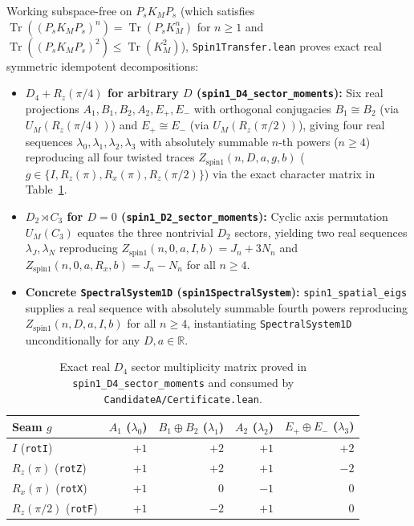 \documentclass[11pt,a4paper]{article}
\newcommand{\id}[1]{{\small\nolinkurl{#1}}}
\newcommand{\Tr}{\operatorname{Tr}}
\newcommand{\R}{\mathbb{R}}
\begin{document}
Working subspace-free on $P_s K_M P_s$ (which satisfies $\Tr((P_s K_M P_s)^n) = \Tr(P_s K_M^n)$ for $n \ge 1$ and $\Tr((P_s K_M P_s)^2) \le \Tr(K_M^2)$), \id{Spin1Transfer.lean} proves exact real symmetric idempotent decompositions:
\begin{itemize}[leftmargin=1.6em,itemsep=2pt]
  \item \textbf{$D_4 + R_z(\pi/4)$ for arbitrary $D$ (\id{spin1_D4_sector_moments}):} Six real projections $A_1, B_1, B_2, A_2, E_+, E_-$ with orthogonal conjugacies $B_1 \cong B_2$ (via $U_M(R_z(\pi/4))$) and $E_+ \cong E_-$ (via $U_M(R_z(\pi/2))$), giving four real sequences $\lambda_0, \lambda_1, \lambda_2, \lambda_3$ with absolutely summable $n$-th powers ($n \ge 4$) reproducing all four twisted traces $Z_{\mathrm{spin1}}(n, D, a, g, b)$ ($g \in \{I, R_z(\pi), R_x(\pi), R_z(\pi/2)\}$) via the exact character matrix in Table~\ref{tab:d4}.
  \item \textbf{$D_2 \rtimes C_3$ for $D = 0$ (\id{spin1_D2_sector_moments}):} Cyclic axis permutation $U_M(C_3)$ equates the three nontrivial $D_2$ sectors, yielding two real sequences $\lambda_J, \lambda_N$ reproducing $Z_{\mathrm{spin1}}(n, 0, a, I, b) = J_n + 3 N_n$ and $Z_{\mathrm{spin1}}(n, 0, a, R_x, b) = J_n - N_n$ for all $n \ge 4$.
  \item \textbf{Concrete \id{SpectralSystem1D} (\id{spin1SpectralSystem}):} \id{spin1_spatial_eigs} supplies a real sequence with absolutely summable fourth powers reproducing $Z_{\mathrm{spin1}}(n, D, a, I, b)$ for all $n \ge 4$, instantiating \id{SpectralSystem1D} unconditionally for any $D, a \in \R$.
\end{itemize}

\begin{table}[t]
\centering
\small
\begin{tabular}{@{}lrrrr@{}}
\toprule
\textbf{Seam $g$} & $A_1$ ($\lambda_0$) & $B_1 \oplus B_2$ ($\lambda_1$) & $A_2$ ($\lambda_2$) & $E_+ \oplus E_-$ ($\lambda_3$) \\
\midrule
$I$ (\id{rotI}) & $+1$ & $+2$ & $+1$ & $+2$ \\
$R_z(\pi)$ (\id{rotZ}) & $+1$ & $+2$ & $+1$ & $-2$ \\
$R_x(\pi)$ (\id{rotX}) & $+1$ & $0$ & $-1$ & $0$ \\
$R_z(\pi/2)$ (\id{rotF}) & $+1$ & $-2$ & $+1$ & $0$ \\
\bottomrule
\end{tabular}
\caption{Exact real $D_4$ sector multiplicity matrix proved in \id{spin1_D4_sector_moments} and consumed by \id{CandidateA/Certificate.lean}.}
\label{tab:d4}
\end{table}
\end{document}
